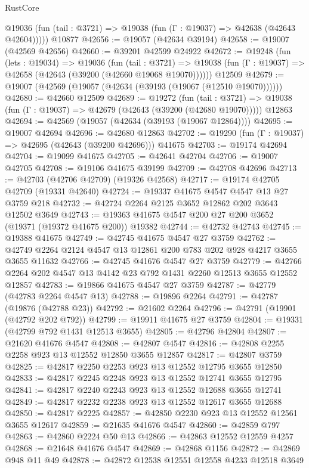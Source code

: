 \begin{lexlean}{RustCore}
\begin{coremodule}
      @19036 (fun (tail : @3721) => @19038 (fun (Γ : @19037) => @42638 (@42643 @42604)))))
    @10877
@42656 := @19057 (@42634 @39194)
@42658 := @19007 (@42569 @42656)
@42660 := @39201 @42599 @24922
@42672 := @19248
    (fun (lets : @19034) =>
    @19036
      (fun (tail : @3721) =>
      @19038 (fun (Γ : @19037) => @42658 (@42643 (@39200 (@42660 @19068 @19070))))))
    @12509
@42679 := @19007 (@42569 (@19057 (@42634 (@39193 (@19067 (@12510 @19070))))))
@42680 := @42660 @12509
@42689 := @19272
    (fun (tail : @3721) => @19038 (fun (Γ : @19037) => @42679 (@42643 (@39200 (@42680 @19070)))))
    @12863
@42694 := @42569 (@19057 (@42634 (@39193 (@19067 @12864))))
@42695 := @19007 @42694
@42696 := @42680 @12863
@42702 := @19290 (fun (Γ : @19037) => @42695 (@42643 (@39200 @42696))) @41675
@42703 := @19174 @42694
@42704 := @19099 @41675
@42705 := @42641 @42704
@42706 := @19007 @42705
@42708 := @19106 @41675 @39199
@42709 := @42708 @42696
@42713 := @42703 (@42706 @42709) (@19326 @42568)
@42717 := @19174 @42705 @42709 (@19331 @42640)
@42724 := @19337 @41675 @4547 @4547 @13 @27 @3759 @218
@42732 := @42724 @2264 @2125 @3652 @12862 @202 @3643 @12502 @3649
@42743 := @19363 @41675 @4547 @200 @27 @200 @3652 (@19371 (@19372 @41675 @200)) @19382
@42744 := @42732 @42743
@42745 := @19388 @41675
@42749 := @42745 @41675 @4547 @27 @3759
@42762 := @42749 @2264 @2124 @4547 @13 @12861 @200 @783 @202 @928 @4217 @3655 @3655 @11632
@42766 := @42745 @41676 @4547 @27 @3759
@42779 := @42766 @2264 @202 @4547 @13 @4142 @23 @792 @1431 @2260 @12513 @3655 @12552 @12857
@42783 := @19866 @41675 @4547 @27 @3759
@42787 := @42779 (@42783 @2264 @4547 @13)
@42788 := @19896 @2264
@42791 := @42787 (@19876 (@42788 @23))
@42792 := @21602 @2264
@42796 := @42791 (@19901 (@42792 @202 @792))
@42799 := @19911 @41675 @27 @3759
@42804 := @19331 (@42799 @792 @1431 @12513 @3655)
@42805 := @42796 @42804
@42807 := @21620 @41676 @4547
@42808 := @42807 @4547
@42816 := @42808 @2255 @2258 @923 @13 @12552 @12850 @3655 @12857
@42817 := @42807 @3759
@42825 := @42817 @2250 @2253 @923 @13 @12552 @12795 @3655 @12850
@42833 := @42817 @2245 @2248 @923 @13 @12552 @12741 @3655 @12795
@42841 := @42817 @2240 @2243 @923 @13 @12552 @12688 @3655 @12741
@42849 := @42817 @2232 @2238 @923 @13 @12552 @12617 @3655 @12688
@42850 := @42817 @2225
@42857 := @42850 @2230 @923 @13 @12552 @12561 @3655 @12617
@42859 := @21635 @41676 @4547
@42860 := @42859 @797
@42863 := @42860 @2224 @50 @13
@42866 := @42863 @12552 @12559 @4257
@42868 := @21648 @41676 @4547
@42869 := @42868 @1156
@42872 := @42869 @948 @11 @49
@42878 := @42872 @12538 @12551 @12558 @4233 @12518 @3649

\end{coremodule}
\end{lexlean}

